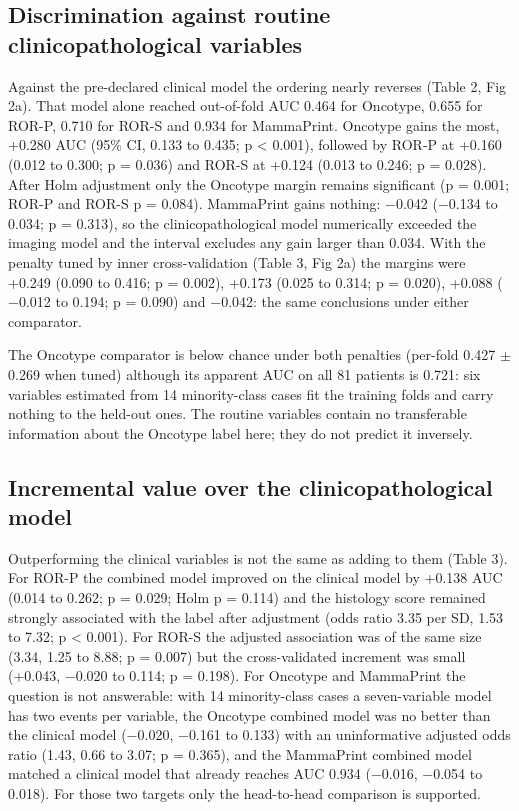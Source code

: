 \documentclass[11pt,a4paper]{article}
\begin{document}
\subsection{Discrimination against routine clinicopathological variables}
Against the pre-declared clinical model the ordering nearly reverses (Table 2, Fig 2a). That model alone reached out-of-fold AUC 0.464 for Oncotype, 0.655 for ROR-P, 0.710 for ROR-S and 0.934 for MammaPrint. Oncotype gains the most, +0.280 AUC (95\% CI, 0.133 to 0.435; p < 0.001), followed by ROR-P at +0.160 (0.012 to 0.300; p = 0.036) and ROR-S at +0.124 (0.013 to 0.246; p = 0.028). After Holm adjustment only the Oncotype margin remains significant (p = 0.001; ROR-P and ROR-S p = 0.084). MammaPrint gains nothing: $-$0.042 ($-$0.134 to 0.034; p = 0.313), so the clinicopathological model numerically exceeded the imaging model and the interval excludes any gain larger than 0.034. With the penalty tuned by inner cross-validation (Table 3, Fig 2a) the margins were +0.249 (0.090 to 0.416; p = 0.002), +0.173 (0.025 to 0.314; p = 0.020), +0.088 ($-$0.012 to 0.194; p = 0.090) and $-$0.042: the same conclusions under either comparator.

The Oncotype comparator is below chance under both penalties (per-fold 0.427 $\pm$ 0.269 when tuned) although its apparent AUC on all 81 patients is 0.721: six variables estimated from 14 minority-class cases fit the training folds and carry nothing to the held-out ones. The routine variables contain no transferable information about the Oncotype label here; they do not predict it inversely.

\subsection{Incremental value over the clinicopathological model}
Outperforming the clinical variables is not the same as adding to them (Table 3). For ROR-P the combined model improved on the clinical model by +0.138 AUC (0.014 to 0.262; p = 0.029; Holm p = 0.114) and the histology score remained strongly associated with the label after adjustment (odds ratio 3.35 per SD, 1.53 to 7.32; p < 0.001). For ROR-S the adjusted association was of the same size (3.34, 1.25 to 8.88; p = 0.007) but the cross-validated increment was small (+0.043, $-$0.020 to 0.114; p = 0.198). For Oncotype and MammaPrint the question is not answerable: with 14 minority-class cases a seven-variable model has two events per variable, the Oncotype combined model was no better than the clinical model ($-$0.020, $-$0.161 to 0.133) with an uninformative adjusted odds ratio (1.43, 0.66 to 3.07; p = 0.365), and the MammaPrint combined model matched a clinical model that already reaches AUC 0.934 ($-$0.016, $-$0.054 to 0.018). For those two targets only the head-to-head comparison is supported.
\end{document}
